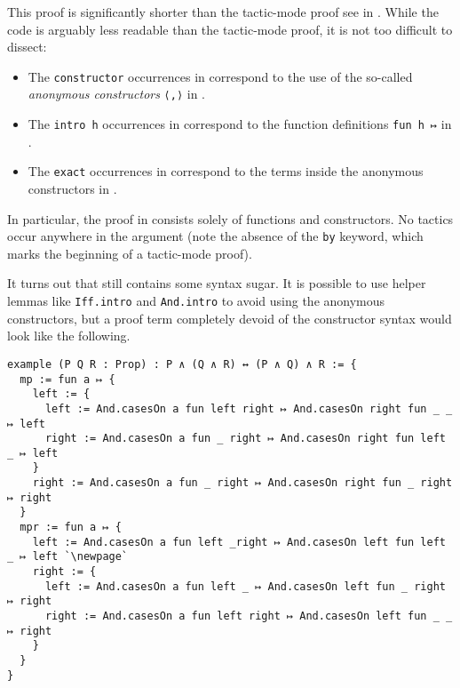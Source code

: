 
This proof is significantly shorter than the tactic-mode proof see in . While the code is arguably less readable than the tactic-mode proof, it is not too difficult to dissect:
\begin{itemize}
    \item The \lstinline|constructor| occurrences in  correspond to the use of the so-called \textit{anonymous constructors} \lstinline|⟨,⟩| in .

    \item The \lstinline|intro h| occurrences in  correspond to the function definitions \lstinline|fun h ↦| in .

    \item The \lstinline|exact| occurrences in  correspond to the terms inside the anonymous constructors in .
\end{itemize}

In particular, the proof in  consists solely of functions and constructors. No tactics occur anywhere in the argument (note the absence of the \lstinline|by| keyword, which marks the beginning of a tactic-mode proof).

It turns out that  still contains some syntax sugar. It is possible to use helper lemmas like \verb|Iff.intro| and \verb|And.intro| to avoid using the anonymous constructors, but a proof term completely devoid of the constructor syntax would look like the following.

\begin{lstlisting}[caption=A proof term for the associativity of $\land$, label=Ch5:Listing:And_assoc_proof_term, escapeinside=``]
example (P Q R : Prop) : P ∧ (Q ∧ R) ↔ (P ∧ Q) ∧ R := {
  mp := fun a ↦ {
    left := {
      left := And.casesOn a fun left right ↦ And.casesOn right fun _ _ ↦ left
      right := And.casesOn a fun _ right ↦ And.casesOn right fun left _ ↦ left
    }
    right := And.casesOn a fun _ right ↦ And.casesOn right fun _ right ↦ right
  }
  mpr := fun a ↦ {
    left := And.casesOn a fun left _right ↦ And.casesOn left fun left _ ↦ left `\newpage`
    right := {
      left := And.casesOn a fun left _ ↦ And.casesOn left fun _ right ↦ right
      right := And.casesOn a fun left right ↦ And.casesOn left fun _ _ ↦ right
    }
  }
}
\end{lstlisting}

